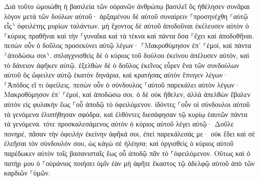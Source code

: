\documentclass[twoside, 9pt]{extreport}
\begin{document}
Διὰ τοῦτο ὡμοιώθη ἡ βασιλεία τῶν οὐρανῶν ἀνθρώπῳ βασιλεῖ ὃς ἠθέλησεν συνᾶραι λόγον μετὰ τῶν δούλων αὐτοῦ· 
ἀρξαμένου δὲ αὐτοῦ συναίρειν ⸀προσηνέχθη ⸂αὐτῷ εἷς⸃ ὀφειλέτης μυρίων ταλάντων. 
μὴ ἔχοντος δὲ αὐτοῦ ἀποδοῦναι ἐκέλευσεν αὐτὸν ὁ ⸀κύριος πραθῆναι καὶ τὴν ⸀γυναῖκα καὶ τὰ τέκνα καὶ πάντα ὅσα ⸀ἔχει καὶ ἀποδοθῆναι. 
πεσὼν οὖν ὁ δοῦλος προσεκύνει αὐτῷ λέγων· ⸀Μακροθύμησον ἐπ᾽ ⸀ἐμοί, καὶ πάντα ⸂ἀποδώσω σοι⸃. 
σπλαγχνισθεὶς δὲ ὁ κύριος τοῦ δούλου ἐκείνου ἀπέλυσεν αὐτόν, καὶ τὸ δάνειον ἀφῆκεν αὐτῷ. 
ἐξελθὼν δὲ ὁ δοῦλος ἐκεῖνος εὗρεν ἕνα τῶν συνδούλων αὐτοῦ ὃς ὤφειλεν αὐτῷ ἑκατὸν δηνάρια, καὶ κρατήσας αὐτὸν ἔπνιγεν λέγων· ⸀Ἀπόδος εἴ τι ὀφείλεις. 
πεσὼν οὖν ὁ σύνδουλος ⸀αὐτοῦ παρεκάλει αὐτὸν λέγων· Μακροθύμησον ἐπ᾽ ⸀ἐμοί, καὶ ἀποδώσω σοι. 
ὁ δὲ οὐκ ἤθελεν, ἀλλὰ ἀπελθὼν ἔβαλεν αὐτὸν εἰς φυλακὴν ἕως ⸀οὗ ἀποδῷ τὸ ὀφειλόμενον. 
ἰδόντες ⸀οὖν οἱ σύνδουλοι αὐτοῦ τὰ γενόμενα ἐλυπήθησαν σφόδρα, καὶ ἐλθόντες διεσάφησαν τῷ κυρίῳ ἑαυτῶν πάντα τὰ γενόμενα. 
τότε προσκαλεσάμενος αὐτὸν ὁ κύριος αὐτοῦ λέγει αὐτῷ· Δοῦλε πονηρέ, πᾶσαν τὴν ὀφειλὴν ἐκείνην ἀφῆκά σοι, ἐπεὶ παρεκάλεσάς με· 
οὐκ ἔδει καὶ σὲ ἐλεῆσαι τὸν σύνδουλόν σου, ὡς κἀγὼ σὲ ἠλέησα; 
καὶ ὀργισθεὶς ὁ κύριος αὐτοῦ παρέδωκεν αὐτὸν τοῖς βασανισταῖς ἕως οὗ ἀποδῷ πᾶν τὸ ⸀ὀφειλόμενον. 
Οὕτως καὶ ὁ πατήρ μου ὁ ⸀οὐράνιος ποιήσει ὑμῖν ἐὰν μὴ ἀφῆτε ἕκαστος τῷ ἀδελφῷ αὐτοῦ ἀπὸ τῶν καρδιῶν ⸀ὑμῶν. 
\end{document}
